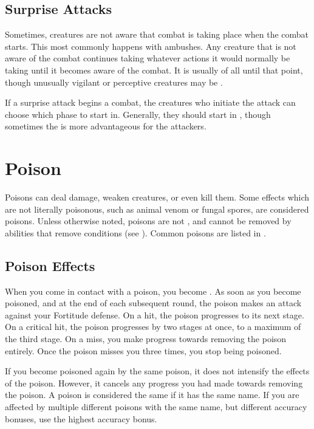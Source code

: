     \subsection{Surprise Attacks}\label{Surprise Attacks}
        Sometimes, creatures are not aware that combat is taking place when the combat starts.
        This most commonly happens with ambushes.
        Any creature that is not aware of the combat continues taking whatever actions it would normally be taking until it becomes aware of the combat.
        It is usually \unaware of all until that point, though unusually vigilant or perceptive creatures may be \partiallyunaware.

        If a surprise attack begins a combat, the creatures who initiate the attack can choose which phase to start in.
        Generally, they should start in , though sometimes the  is more advantageous for the attackers.

\section{Poison}\label{Poison}
    Poisons can deal damage, weaken creatures, or even kill them.
    Some effects which are not literally poisonous, such as animal venom or fungal spores, are considered poisons.
    Unless otherwise noted, poisons are not , and cannot be removed by abilities that remove conditions (see ).
    Common poisons are listed in .

    \subsection{Poison Effects}\label{Poison Effects}
        When you come in contact with a poison, you become .
        As soon as you become poisoned, and at the end of each subsequent round, the poison makes an attack against your Fortitude defense.
        On a hit, the poison progresses to its next stage.
        On a critical hit, the poison progresses by two stages at once, to a maximum of the third stage.
        On a miss, you make progress towards removing the poison entirely.
        Once the poison misses you three times, you stop being poisoned.

        If you become poisoned again by the same poison, it does not intensify the effects of the poison.
        However, it cancels any progress you had made towards removing the poison.
        A poison is considered the same if it has the same name.
        If you are affected by multiple different poisons with the same name, but different accuracy bonuses, use the highest accuracy bonus.

